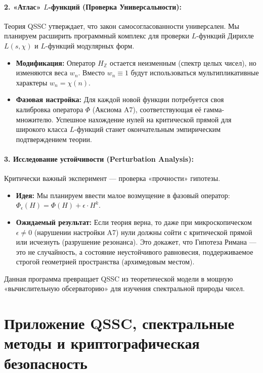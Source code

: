 \documentclass{article}
\numberwithin{equation}{section}
\theoremstyle{plain}
\theoremstyle{definition}
\theoremstyle{remark}
\def\cdot{·}\def\times{×}\def\pm{±}\def\mp{∓}\def\approx{≈}%
\begin{document}
\paragraph{2. «Атлас» $L$-функций (Проверка Универсальности):}
Теория QSSC утверждает, что закон самосогласованности универсален. Мы планируем расширить программный комплекс для проверки $L$-функций Дирихле $L(s, \chi)$ и $L$-функций модулярных форм.
\begin{itemize}
    \item \textbf{Модификация:} Оператор $H_{\mathbb{Z}}$ остается неизменным (спектр целых чисел), но изменяются веса $w_n$. Вместо $w_n \equiv 1$ будут использоваться мультипликативные характеры $w_n = \chi(n)$.
    \item \textbf{Фазовая настройка:} Для каждой новой функции потребуется своя калибровка оператора $\Phi$ (Аксиома A7), соответствующая её гамма-множителю. Успешное нахождение нулей на критической прямой для широкого класса $L$-функций станет окончательным эмпирическим подтверждением теории.
\end{itemize}

\paragraph{3. Исследование устойчивости (Perturbation Analysis):}
Критически важный эксперимент — проверка «прочности» гипотезы.
\begin{itemize}
    \item \textbf{Идея:} Мы планируем ввести малое возмущение в фазовый оператор: $\Phi_{\epsilon}(H) = \Phi(H) + \epsilon \cdot H^k$.
    \item \textbf{Ожидаемый результат:} Если теория верна, то даже при микроскопическом $\epsilon \neq 0$ (нарушении настройки A7) нули должны сойти с критической прямой или исчезнуть (разрушение резонанса). Это докажет, что Гипотеза Римана — это не случайность, а состояние неустойчивого равновесия, поддерживаемое строгой геометрией пространства (архимедовым местом).
\end{itemize}

Данная программа превращает QSSC из теоретической модели в мощную «вычислительную обсерваторию» для изучения спектральной природы чисел.




\clearpage

\section {Приложение QSSC, спектральные методы и криптографическая безопасность}
\label{sec:crypto-implications}
\end{document}
